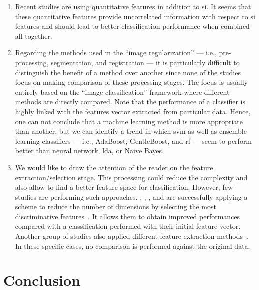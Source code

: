 \begin{enumerate}
\item Recent studies are using quantitative features in addition to \ac{si}.
It seems that these quantitative features provide uncorrelated information with
respect to \ac{si} features and should lead to better classification
performance when combined all together.

\item Regarding the methods used in the ``image regularization'' --- i.e.,
  pre-processing, segmentation, and registration --- it is particularly
  difficult to distinguish the benefit of a method over another since none of
  the studies focus on making comparison of these processing stages.
The focus is usually entirely based on the ``image classification'' framework
where different methods are directly compared.
Note that the performance of a classifier is highly linked with the features
vector extracted from particular data.
Hence, one can not conclude that a machine learning method is more appropriate
than another, but we can identify a trend in which \ac{svm} as well as ensemble
learning classifiers --- i.e., AdaBoost, GentleBoost, and \ac{rf} --- seem to
perform better than neural network, \ac{lda}, or Naive Bayes.

\item We would like to draw the attention of the reader on the feature
  extraction/selection stage.
This processing could reduce the complexity and also allow to find a better
feature space for classification.
However, few studies are performing such approaches.
\citeauthor{Niaf2012}, \citeauthor{khalvati2015automated},
\citeauthor{chung2015prostate}, and \citeauthor{rampun2016computer} are
successfully applying a scheme to reduce the number of dimensions by selecting
the most discriminative
features~\cite{Niaf2011,Niaf2012,khalvati2015automated,chung2015prostate,rampun2016computer,rampun2015computer}.
It allows them to obtain improved performances compared with a classification
performed with their initial feature vector.
Another group of studies also applied different feature extraction
methods~\cite{Viswanath2008a,Viswanath2008,Viswanath2012,Tiwari2007,Tiwari2008,Tiwari2009,Tiwari2010,Tiwari2012,Tiwari2013,lehaire2014computer,rampun2016computerb,rampun2015classifying}.
In these specific cases, no comparison is performed against the original data.
\end{enumerate}

\section{Conclusion}\label{subsec:chp3:dis:gen-dis}

